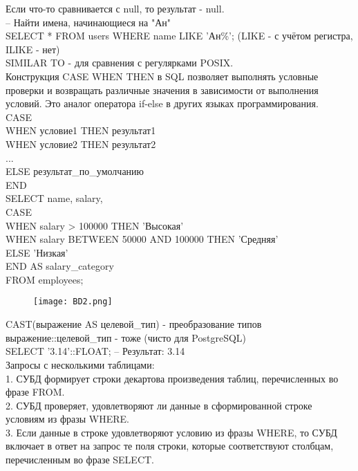 \noindent Если что-то сравнивается с null, то результат - null. \\

\noindent -- Найти имена, начинающиеся на "Ан" \\
SELECT * FROM users WHERE name LIKE 'Ан\%'; (LIKE - с учётом регистра, ILIKE - нет) \\

\noindent SIMILAR TO - для сравнения с регулярками POSIX. \\

\noindent Конструкция CASE WHEN THEN в SQL позволяет выполнять условные проверки и возвращать различные значения в зависимости от выполнения условий. Это аналог оператора if-else в других языках программирования.  \\
CASE \\
    WHEN условие1 THEN результат1 \\
    WHEN условие2 THEN результат2 \\
    ... \\
    ELSE результат\_по\_умолчанию \\
END \\


\noindent SELECT name, salary, \\
CASE \\
WHEN salary > 100000 THEN 'Высокая' \\
WHEN salary BETWEEN 50000 AND 100000 THEN 'Средняя' \\
ELSE 'Низкая' \\
END AS salary\_category \\
FROM employees; \\
\begin{figure}[H]
    \centering
    \texttt{[image: BD2.png]}
\end{figure}

\noindent CAST(выражение AS целевой\_тип) - преобразование типов \\
выражение::целевой\_тип - тоже (чисто для PostgreSQL) \\
SELECT '3.14'::FLOAT; -- Результат: 3.14 \\

\noindent Запросы с несколькими таблицами: \\
1. СУБД формирует строки декартова произведения таблиц, перечисленных во фразе FROM. \\
2. СУБД проверяет, удовлетворяют ли данные в сформированной строке условиям из фразы WHERE. \\
3. Если данные в строке удовлетворяют условию из фразы WHERE, то СУБД включает в ответ на запрос те поля строки, которые соответствуют столбцам, перечисленным во фразе SELECT. \\

